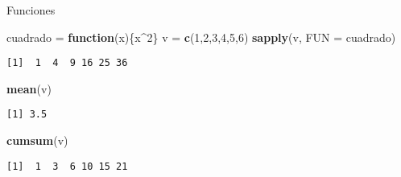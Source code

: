 \documentclass[
  ignorenonframetext,
]{beamer}
\newenvironment{Shaded}{\begin{snugshade}}{\end{snugshade}}
\newcommand{\ControlFlowTok}[1]{\textcolor[rgb]{0.13,0.29,0.53}{\textbf{#1}}}
\newcommand{\DataTypeTok}[1]{\textcolor[rgb]{0.13,0.29,0.53}{#1}}
\newcommand{\DecValTok}[1]{\textcolor[rgb]{0.00,0.00,0.81}{#1}}
\newcommand{\KeywordTok}[1]{\textcolor[rgb]{0.13,0.29,0.53}{\textbf{#1}}}
\newcommand{\NormalTok}[1]{#1}
\newcommand{\OperatorTok}[1]{\textcolor[rgb]{0.81,0.36,0.00}{\textbf{#1}}}
\newcommand{\StringTok}[1]{\textcolor[rgb]{0.31,0.60,0.02}{#1}}
\begin{document}
\begin{frame}[fragile]{Funciones}
\protect\hypertarget{funciones-3}{}

\begin{Shaded}
\begin{Highlighting}[]
\NormalTok{cuadrado =}\StringTok{ }\ControlFlowTok{function}\NormalTok{(x)\{x}\OperatorTok{^}\DecValTok{2}\NormalTok{\}}
\NormalTok{v =}\StringTok{ }\KeywordTok{c}\NormalTok{(}\DecValTok{1}\NormalTok{,}\DecValTok{2}\NormalTok{,}\DecValTok{3}\NormalTok{,}\DecValTok{4}\NormalTok{,}\DecValTok{5}\NormalTok{,}\DecValTok{6}\NormalTok{)}
\KeywordTok{sapply}\NormalTok{(v, }\DataTypeTok{FUN =}\NormalTok{ cuadrado)}
\end{Highlighting}
\end{Shaded}

\begin{verbatim}
[1]  1  4  9 16 25 36
\end{verbatim}

\begin{Shaded}
\begin{Highlighting}[]
\KeywordTok{mean}\NormalTok{(v)}
\end{Highlighting}
\end{Shaded}

\begin{verbatim}
[1] 3.5
\end{verbatim}

\begin{Shaded}
\begin{Highlighting}[]
\KeywordTok{cumsum}\NormalTok{(v)}
\end{Highlighting}
\end{Shaded}

\begin{verbatim}
[1]  1  3  6 10 15 21
\end{verbatim}

\end{frame}
\end{document}
